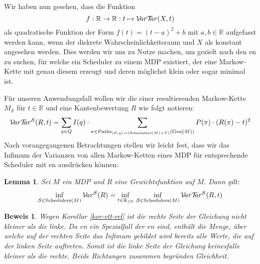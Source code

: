 \documentclass[a4paper]{article}
\newcommand{\mc}{Markow-Kette}
\newtheorem{lemma}[satz]{Lemma}
\theoremstyle{nonumberplain}
\newtheorem{beweis}{Beweis}
\begin{document}
Wir haben nun gesehen, dass die Funktion
\[
f : \mathbb{R} \to \mathbb{R} : t \mapsto \mathcal{V}\!ar \mathcal{T}\!\!ar(X,t)
\]
als quadratische Funktion der Form $f(t) = (t-a)^2 + b$ mit $a,b \in \mathbb{R}$ aufgefasst werden kann, wenn der diskrete Wahrscheinlichkeitsraum und $X$ als konstant angesehen werden.  Dies werden wir uns zu Nutze machen, um gezielt nach den \expect{}en zu suchen, für welche ein Scheduler zu einem MDP existiert, der eine \mc{} mit genau diesem \expect{} erzeugt und deren \var{} möglichst klein oder sogar minimal ist.
\begin{comment}
Dabei ergibt sich $a = \mathcal{E}(X)$ und $b = \mvar(X)$:
\begin{align*}
	& & f(t) & =  \sum_{\omega \in \Omega}{P(\omega) \cdot \left((X(\omega)-t)^2\right)} \\
	\implies & & f(t) & = \sum_{\omega \in \Omega}{P(\omega) \cdot \left(t^2 -2tX(\omega) + \left(\mathcal{E}(X)\right)^2 - \left(\mathcal{E}(X)\right)^2 + \left(X(\omega)\right)^2\right)} \\
	\implies & & f(t) & = \left(t - \mathcal{E}(X)\right)^2 - \left(\mathcal{E}(X)\right)^2 + \mathcal{E}(X^2) \\
	\implies & & f(t) & = \left(t - \mathcal{E}(X)\right)^2 + \mvar(X) \\
\end{align*}
\end{comment}

Für unseren Anwendungsfall wollen wir die \vt{} einer resultierenden \mc{} $M_\mathcal{S}$ für $t \in \mathbb{R}$ und eine Kantenbewertung $R$ wie folgt notieren:
\begin{equation}\label{eq-vts}
\mathcal{V}\!ar \mathcal{T}\!\!ar^{\mathcal{S}}(R,t) = \sum_{q \in Q}{I(q)} \cdot \sum_{\pi \in \mathrm{Paths}_{({\mathcal{S}},q) \rightarrow (\mathrm{Schedulers}(M)\times T)}(\mathrm{Gen}(M))}{P(\pi) \cdot (R(\pi) - t)^2}
\end{equation}
Nach vorangegangenen Betrachtungen stellen wir leicht fest, dass wir das Infimum der Varianzen von allen \mc{}n eines MDP für entsprechende Scheduler mit \vt{}en ausdrücken können:
\begin{lemma} Sei $M$ ein MDP und $R$ eine Gewichtsfunktion auf $M$. Dann gilt:
\begin{equation}
\inf_{\mathcal{S} \in \mathrm{Schedulers}(M)}{\mathcal{V}\!ar^{\mathcal{S}}(R)}
=
\inf_{t \in \mathbb{R}_{\geq 0}}{
	\:\inf_{\mathcal{S} \in \mathrm{Schedulers}(M)}{
		\mathcal{V}\!ar \mathcal{T}\!\!ar^{\mathcal{S}}(R,t)
	}
}
\end{equation}
\end{lemma}
\begin{beweis}
	Wegen Korollar \ref{kor-vtt-rel} ist die rechte Seite der Gleichung nicht kleiner als die linke. Da \var{}en ein Spezialfall der \vt{}en sind, enthält die Menge, über welche auf der rechten Seite das Infimum gebildet wird bereits alle Werte, die auf der linken Seite auftreten. Somit ist die linke Seite der Gleichung keinesfalls kleiner als die rechte. Beide Richtungen zusammen begründen Gleichheit.
\end{beweis}
\end{document}

